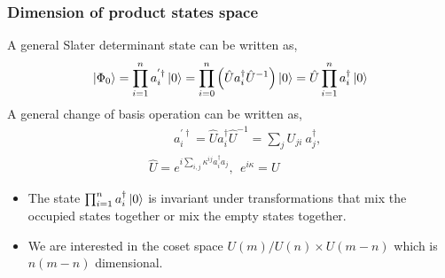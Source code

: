 \documentclass{beamer}
\renewcommand{\(}{\left(}
\renewcommand{\)}{\right)}
\renewcommand{\[}{\left[}
\renewcommand{\]}{\right]}
\begin{document}
\begin{frame}
    \frametitle{Dimension of product states space}

    A general Slater determinant state can be written as, 
    \begin{align*}
        \ket{\Phi_0} = \prod_{i=1}^n a^{'\dagger}_i \ket{0} =  \prod_{i=0}^n \(\hat{U} a^\dagger_i \hat{U}^{-1}\) \ket{0} = \hat{U} \prod_{i=1}^n a^{\dagger}_i \ket{0}
    \end{align*}
    A general change of basis operation can be written as, 
    \begin{align*}
        &\qquad a^{'\dagger}_i = \hat{U} a^\dagger_i \hat{U}^{-1} = \sum_{j} U_{ji} \  a^\dagger_j, \\
        &\hat{U} = e^{i\sum_{i,j}\kappa^{ij} a^\dagger_i a_j}, \ \  e^{i\kappa} = U
    \end{align*}
    \pause
    \begin{itemize}
        \item The state $\prod_{i=1}^n a^{\dagger}_i \ket{0}$ is invariant under transformations that mix the occupied states together or mix the empty states together. 
        \item We are interested in the coset space $U(m)/U(n)\times U(m-n)$ which is $n(m-n)$ dimensional.
    \end{itemize}
\end{frame}
\end{document}
